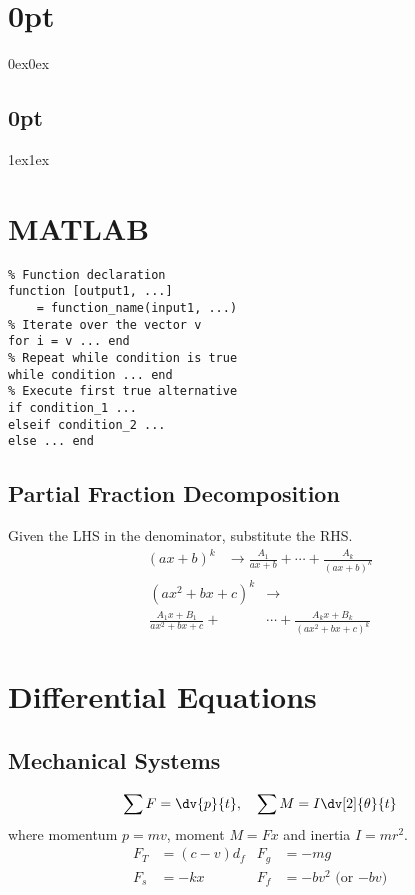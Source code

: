 \documentclass{article}
\begin{document}
\titlespacing*\section{0pt}{0ex}{0ex}
\titlespacing*\subsection{0pt}{1ex}{1ex}
%
\setlength{\abovecaptionskip}{-5pt}
\setlength{\textfloatsep}{0pt}
%
\setlength{\abovedisplayskip}{1pt}
\setlength{\belowdisplayskip}{1pt}
%
\lstset{language=Matlab, upquote=true}
%
\begin{multicols}{3}
    \section*{MATLAB}
    \lstset{belowskip=0pt, aboveskip=0pt}
    \begin{lstlisting}
% Function declaration
function [output1, ...]
    = function_name(input1, ...)
% Iterate over the vector v
for i = v ... end 
% Repeat while condition is true
while condition ... end
% Execute first true alternative
if condition_1 ...
elseif condition_2 ... 
else ... end
\end{lstlisting}
    \subsection*{Partial Fraction Decomposition}
    Given the LHS in the denominator, substitute the RHS.
    \begin{align*}
        \left(ax+b\right)^k & \to \frac{A_1}{ax+b} + \cdots + \frac{A_k}{\left( ax+b \right)^k}
    \end{align*}
    \begin{align*}
        \left(ax^2+bx+c\right)^k     & \to                                                  \\
        \frac{A_1x+B_1}{ax^2+bx+c} + & \cdots + \frac{A_kx+B_k}{\left( ax^2+bx+c \right)^k}
    \end{align*}
    \section*{Differential Equations}
    \subsection*{Mechanical Systems}
    \begin{equation*}
        \sum F = \dv{p}{t},\quad \sum M = I \dv[2]{\theta}{t}
    \end{equation*}
    where momentum $p = mv$, moment $M=Fx$ and inertia $I=mr^2$.
    \begin{align*}
        F_T & = \left( c - v \right) d_f & F_g & = -mg                       \\
        F_s & = -kx                      & F_f & = -b v^2 \text{ (or $-bv$)}
    \end{align*}

\end{multicols}
\end{document}
